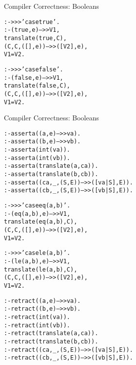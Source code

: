 \documentclass{beamer}
\begin{document}
\begin{frame}[fragile]{Compiler Correctness: Booleans}

\tiny
\begin{alltt}
% it is sufficient to show that for every b in Bexp we have
%
%  (forall b,e)[(b,e) -->> V1 ^ 
%               translate(b,C) ^ 
%               (C,C,([],e)) --> ([V2],e) ^
%               V1 = V2]
%
% proof by induction on Bexp.

%%%%%%%%%%%%%%%%%%%%%%%%%%%%%%%%%%%%%%%%%%%%%%%%%%%%%%%%%%%%%%%%%%%%%
:- >>> 'case true'.
:- (true,e) -->> V1,
   translate(true,C),
   (C,C,([],e)) -->> ([V2],e),
   V1 = V2.

%%%%%%%%%%%%%%%%%%%%%%%%%%%%%%%%%%%%%%%%%%%%%%%%%%%%%%%%%%%%%%%%%%%%%
:- >>> 'case false'.
:- (false,e) -->> V1,
   translate(false,C),
   (C,C,([],e)) -->>([V2],e),
   V1 = V2.
\end{alltt}
\end{frame}

\begin{frame}[fragile]{Compiler Correctness: Booleans}

\tiny
\begin{alltt}
% the following assumptions hold for the relational operators
:- asserta((a,e) -->> va).  % arithmetic exp a -> va
:- asserta((b,e) -->> vb).  % arithmetic exp b -> vb
:- asserta(int(va)).
:- asserta(int(vb)).
:- asserta(translate(a,ca)).
:- asserta(translate(b,cb)).
:- asserta((ca,_,(S,E)) -->> ([va|S],E)).
:- asserta((cb,_,(S,E)) -->> ([vb|S],E)).

:- >>> 'case eq(a,b)'.
:- (eq(a,b),e) -->> V1,
   translate(eq(a,b),C),
   (C,C,([],e))  -->> ([V2],e),
   V1 = V2.

:- >>> 'case le(a,b)'.
:- (le(a,b),e) -->> V1,
   translate(le(a,b),C),
   (C,C,([],e)) -->> ([V2],e),
   V1 = V2.

:- retract((a,e) -->> va).
:- retract((b,e) -->> vb).
:- retract(int(va)).
:- retract(int(vb)).
:- retract(translate(a,ca)).
:- retract(translate(b,cb)).
:- retract((ca,_,(S,E)) -->> ([va|S],E)).
:- retract((cb,_,(S,E)) -->> ([vb|S],E)).
\end{alltt}
\end{frame}
\end{document}

